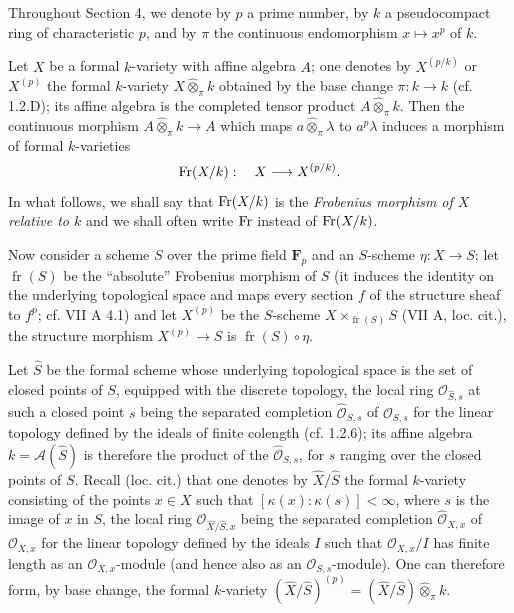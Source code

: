Throughout Section 4, we denote by $p$ a prime number, by $k$ a pseudocompact ring of characteristic $p$, and by $\pi$ the continuous endomorphism $x\mapsto x^p$ of $k$.

Let $X$ be a formal $k$-variety with affine algebra $A$; one denotes by $X^{(p/k)}$ or $X^{(p)}$ the formal $k$-variety $X\widehat\otimes_\pi k$ obtained by the base change $\pi:k\to k$ (cf. 1.2.D); its affine algebra is the completed tensor product $A\widehat\otimes_\pi k$. Then the continuous morphism $A\widehat\otimes_\pi k\to A$ which maps $a\widehat\otimes_\pi\lambda$ to $a^p\lambda$ induces a morphism of formal $k$-varieties
\[
\operatorname{Fr}(X/k):\quad X\longrightarrow X^{(p/k)}.
\]
In what follows, we shall say that $\operatorname{Fr}(X/k)$ is the \emph{Frobenius morphism of $X$ relative to $k$} and we shall often write $\operatorname{Fr}$ instead of $\operatorname{Fr}(X/k)$.

Now consider a scheme $S$ over the prime field $\mathbf F_p$ and an $S$-scheme $\eta:X\to S$; let $\operatorname{fr}(S)$ be the ``absolute'' Frobenius morphism of $S$ (it induces the identity on the underlying topological space and maps every section $f$ of the structure sheaf to $f^p$; cf. VII A 4.1) and let $X^{(p)}$ be the $S$-scheme $X\times_{\operatorname{fr}(S)}S$ (VII A, loc. cit.), \ie the structure morphism $X^{(p)}\to S$ is $\operatorname{fr}(S)\circ\eta$.

Let $\widehat S$ be the formal scheme whose underlying topological space is the set of closed points of $S$, equipped with the discrete topology, the local ring $\mathcal O_{\widehat S,s}$ at such a closed point $s$ being the separated completion $\widehat{\mathcal O}_{S,s}$ of $\mathcal O_{S,s}$ for the linear topology defined by the ideals of finite colength (cf. 1.2.6); its affine algebra $k=\mathscr A(\widehat S)$ is therefore the product of the $\widehat{\mathcal O}_{S,s}$, for $s$ ranging over the closed points of $S$. Recall (loc. cit.) that one denotes by $\widehat X/\widehat S$ the formal $k$-variety consisting of the points $x\in X$ such that $[\kappa(x):\kappa(s)]<\infty$, where $s$ is the image of $x$ in $S$, the local ring $\mathcal O_{\widehat X/\widehat S,x}$ being the separated completion $\widehat{\mathcal O}_{X,x}$ of $\mathcal O_{X,x}$ for the linear topology defined by the ideals $I$ such that $\mathcal O_{X,x}/I$ has finite length as an $\mathcal O_{X,x}$-module (and hence also as an $\mathcal O_{S,s}$-module). One can therefore form, by base change, the formal $k$-variety $(\widehat X/\widehat S)^{(p)}=(\widehat X/\widehat S)\widehat\otimes_\pi k$.

